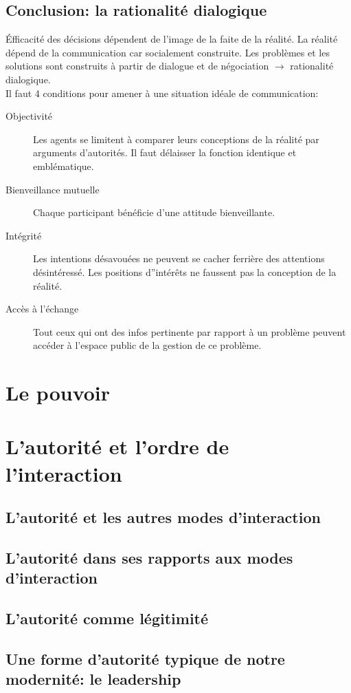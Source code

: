 \documentclass[11pt]{article} %
\begin{document}
	\subsection{Conclusion: la rationalité dialogique}
		Éfficacité des décisions dépendent de l'image de la faite de la réalité. La réalité dépend de la
		communication car socialement construite. Les problèmes et les solutions sont construits à partir
		de dialogue et de négociation $\to$ rationalité dialogique.\\
		Il faut 4 conditions pour amener à une situation idéale de communication:
		\begin{description}
			\item[Objectivité] Les agents se limitent à comparer leurs conceptions de la réalité par arguments
			d'autorités. Il faut délaisser la fonction identique et emblématique.
			\item[Bienveillance mutuelle] Chaque participant bénéficie d'une attitude bienveillante.
			\item[Intégrité] Les intentions désavouées ne peuvent se cacher ferrière des attentions 
			désintéressé. Les positions d''intérêts ne faussent pas la conception de la réalité.
			\item[Accès à l'échange] Tout ceux qui ont des infos pertinente par rapport à un problème peuvent
			accéder à l'espace public de la gestion de ce problème. 
		\end{description}

	

\section{Le pouvoir}
\section{L'autorité et l'ordre de l'interaction}
	\subsection{L'autorité et les autres modes d'interaction}
	\subsection{L'autorité dans ses rapports aux modes d'interaction}
	\subsection{L'autorité comme légitimité}
	\subsection{Une forme d'autorité typique de notre modernité: le leadership}
	

	
	
\end{document}
